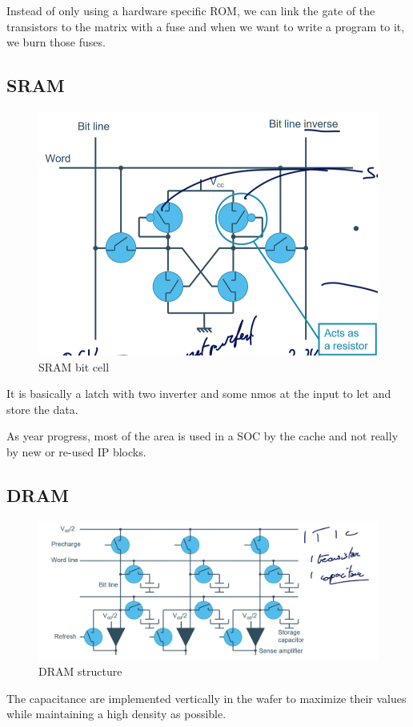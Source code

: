 \documentclass{report}
\begin{document}
Instead of only using a hardware specific ROM, we can link the gate of the transistors to the matrix with a fuse and when we want to write a program to it, we burn those fuses.

\subsection{SRAM}

\begin{figure}[H]
    \centering
    \includegraphics[width=0.5\linewidth]{SRAM-bitcell.png}
    \caption{SRAM bit cell}
    \label{fig:enter-label}
\end{figure}

It is basically a latch with two inverter and some nmos at the input to let and store the data.

As year progress, most of the area is used in a SOC by the cache and not really by new or re-used IP blocks.

\subsection{DRAM}

\begin{figure}[H]
    \centering
    \includegraphics[width=0.75\linewidth]{DRAM-structure.png}
    \caption{DRAM structure}
    \label{fig:DRAM-structure-label}
\end{figure}

The capacitance are implemented vertically in the wafer to maximize their values while maintaining a high density as possible.
\end{document}
